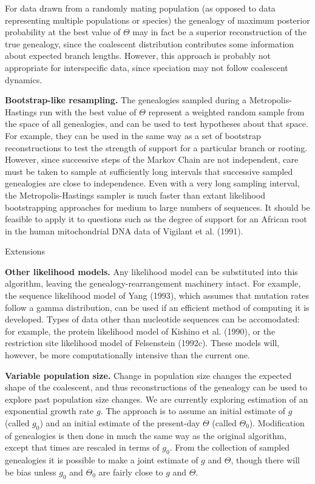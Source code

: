 For data drawn from a randomly mating population (as
opposed to data representing multiple populations or species) the
genealogy of maximum posterior probability at the best value of
$\Theta$ may in fact be a superior reconstruction of the true genealogy,
since the coalescent
distribution contributes some information about expected branch
lengths.  However, this approach is probably not
appropriate for interspecific data, since speciation may not follow
coalescent dynamics.

{\bf Bootstrap-like resampling.}  The genealogies sampled during a 
Metropolis-Hastings run with the best
value of $\Theta$ represent a weighted random sample from the space of
all genealogies, and can be used to test hypotheses about that space.
For example, they can be used in the same way as a set of bootstrap
reconstructions to test the strength of support for a particular branch
or rooting.  However, since successive steps of the Markov Chain are not
independent, care must be taken to sample at sufficiently long intervals
that successive sampled genealogies are close to independence.  Even
with a very long sampling interval, the Metropolis-Hastings sampler is
much faster than extant likelihood bootstrapping approaches for medium
to large numbers of sequences.  It should be feasible to apply it to
questions such as the degree of support for an African root in the
human mitochondrial DNA data of Vigilant et al. (1991).

\bigskip
{\center Extensions}
\bigskip

{\bf Other likelihood models.}  Any likelihood model can be substituted into 
this algorithm, leaving the
genealogy-rearrangement machinery intact.  For example, the sequence
likelihood model of Yang (1993), which assumes that mutation rates
follow a gamma distribution, can be used if an efficient method of
computing it is developed.
Types of data other than
nucleotide sequences can be accomodated:  for example, 
the protein likelihood model of 
Kishino et al. (1990),  
or the restriction site likelihood model of Felsenstein (1992c).
These models will, however, be more 
computationally intensive than the current one. 

{\bf Variable population size.}
Change in population size changes the expected shape of the coalescent,
and thus reconstructions of the genealogy can be used to explore past
population size changes.  We are currently exploring estimation of an
exponential growth rate $g$.  The approach is to assume an initial
estimate of $g$ (called $g_0$) and an initial estimate of the present-day
$\Theta$ (called $\Theta_0$).  Modification of
genealogies is then done in much the same way as the original algorithm,
except that times are rescaled in terms of $g_0$.  From the collection
of sampled genealogies it is possible to make a joint estimate of $g$
and $\Theta$, though there will be bias unless $g_0$ and $\Theta_0$ are
fairly close to $g$ and $\Theta$. 

